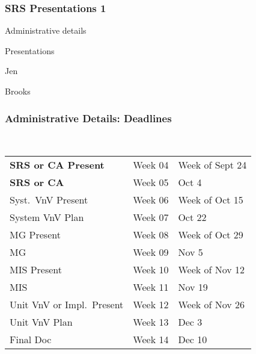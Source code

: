 \documentclass[t,12pt,numbers,fleqn]{beamer}
\begin{document}



\begin{frame}
\frametitle{SRS Presentations 1}

\bi
\item Administrative details
\item Presentations
\bi
\item Jen
\item Brooks
\ei
\ei
\end{frame}


\begin{frame}
\frametitle{Administrative Details: Deadlines}

~\newline
\begin{tabular}{l l l}
\textbf{SRS or CA Present} & Week 04 & Week of Sept 24\\
\textbf{SRS or CA} & Week 05 & Oct 4\\
Syst.\ VnV Present & Week 06 & Week of Oct 15\\
System VnV Plan & Week 07 & Oct 22\\
MG Present & Week 08 & Week of Oct 29\\
MG & Week 09 & Nov 5\\
MIS Present & Week 10 & Week of Nov 12\\
MIS & Week 11 & Nov 19\\
Unit VnV or Impl.\ Present & Week 12 & Week of Nov 26\\
Unit VnV Plan & Week 13 & Dec 3\\
Final Doc & Week 14 & Dec 10\\
\end {tabular}

\end{frame}

\end{document}
